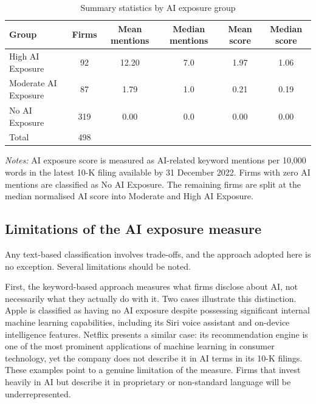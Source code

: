 \begin{table}[htbp]
\centering
\caption{Summary statistics by AI exposure group}
\label{tab:ai-exposure-summary}
\small
\begin{threeparttable}
\begin{tabular}{lccccc}
\toprule
Group & Firms & Mean mentions & Median mentions & Mean score & Median score \\
\midrule
High AI Exposure     & 92  & 12.20 & 7.0 & 1.97 & 1.06 \\
Moderate AI Exposure & 87  & 1.79  & 1.0 & 0.21 & 0.19 \\
No AI Exposure       & 319 & 0.00  & 0.0 & 0.00 & 0.00 \\
\midrule
Total                & 498 &       &     &      &      \\
\bottomrule
\end{tabular}
\begin{tablenotes}[flushleft]
\footnotesize
\item \textit{Notes:} AI exposure score is measured as AI-related keyword mentions per 10,000 words in the latest 10-K filing available by 31 December 2022. Firms with zero AI mentions are classified as No AI Exposure. The remaining firms are split at the median normalised AI score into Moderate and High AI Exposure.
\end{tablenotes}
\end{threeparttable}
\end{table}

\subsection{Limitations of the AI exposure measure}
\label{subsec:ai-measure-limitations}

Any text-based classification involves trade-offs, and the approach adopted here is no exception. Several limitations should be noted.

First, the keyword-based approach measures what firms disclose about AI, not necessarily what they actually do with it. Two cases illustrate this distinction. Apple is classified as having no AI exposure despite possessing significant internal machine learning capabilities, including its Siri voice assistant and on-device intelligence features. Netflix presents a similar case: its recommendation engine is one of the most prominent applications of machine learning in consumer technology, yet the company does not describe it in AI terms in its 10-K filings. These examples point to a genuine limitation of the measure. Firms that invest heavily in AI but describe it in proprietary or non-standard language will be underrepresented.


